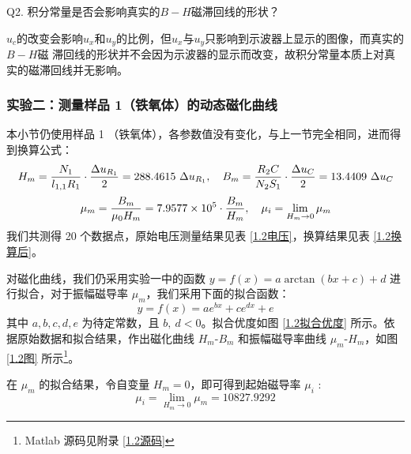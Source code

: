 \documentclass[UTF8]{article}
\theoremstyle{MyLineTheoremStyle} %
\theoremstyle{MyBlockTheoremStyle} %
\theoremstyle{MySubsubsectionStyle} %
\begin{document}
\noindent Q2. 积分常量是否会影响真实的$ B − H $磁滞回线的形状？\par
$u_c$的改变会影响$u_x$和$u_y$的比例，但$u_x$与$u_y$只影响到示波器上显示的图像，而真实的 $B − H $磁
滞回线的形状并不会因为示波器的显示而改变，故积分常量本质上对真实的磁滞回线并无影响。

\subsubsection{实验二：测量样品 1（铁氧体）的动态磁化曲线}
本小节仍使用样品 1 （铁氧体），各参数值没有变化，与上一节完全相同，进而得到换算公式：
\begin{equation}\label{1.2换算公式}
\begin{matrix}\displaystyle
H_m = \frac{N_1}{l_{1, 1}R_1}\cdot \frac{\Delta u_{R_1}}{2} = 288.4615\ \Delta u_{R_1},\quad 
B_m = \frac{R_2 C}{N_2 S_1}\cdot \frac{\Delta u_C}{2} = 13.4409 \ \Delta u_C \vspace*{2mm}
\\ \displaystyle
\mu_m = \frac{B_m}{\mu_0H_m} =  7.9577 \times 10^{5} \cdot \frac{B_m}{H_m},\quad \mu_i = \lim_{H_m\to 0} \mu_m
\end{matrix}
\end{equation}
我们共测得 20 个数据点，原始电压测量结果见表 \ref{1.2电压}，换算结果见表 \ref{1.2换算后}。

对磁化曲线，我们仍采用实验一中的函数 $y = f(x) = a \arctan (b x + c) + d$ 进行拟合，对于振幅磁导率 $\mu_m$，我们采用下面的拟合函数：
\begin{equation}
    y = f(x) = ae^{bx} + ce^{dx} + e
\end{equation}
其中 $a, b, c, d, e$ 为待定常数，且 $b,\ d < 0$。拟合优度如图 \ref{1.2拟合优度} 所示。依据原始数据和拟合结果，作出磁化曲线 $H_m$-$B_m$ 和振幅磁导率曲线 $\mu_m$-$H_m$，如图 \ref{1.2图} 所示\footnote{Matlab 源码见附录 \ref{1.2源码}}。

在 $\mu_m$ 的拟合结果，令自变量 $H_m = 0$，即可得到起始磁导率 $\mu_i$ :
\begin{equation}
\mu_i = \lim_{H_m\to 0} \mu_m = 10827.9292
\end{equation}
\end{document}
